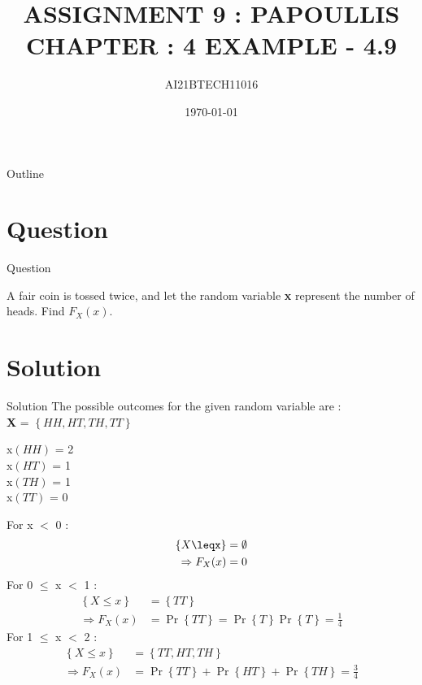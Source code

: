 \documentclass{beamer}
\title{ASSIGNMENT 9 : PAPOULLIS CHAPTER : 4 EXAMPLE - 4.9}
\author{AI21BTECH11016}
\date{\today}
\providecommand{\pr}[1]{\ensuremath{\Pr\left\{#1\right\}}}
\providecommand{\brak}[1]{\ensuremath{\left(#1\right)}}
\providecommand{\cbrak}[1]{\ensuremath{\left\{#1\right\}}}
\begin{document}
\begin{frame}
    \titlepage 
\end{frame}

\logo{}

\begin{frame}{Outline}
    \tableofcontents
\end{frame}

\section{Question}
\begin{frame}{Question}
\begin{block}{}
A fair coin is tossed twice, and let the random variable \textbf{x} represent the number of
heads. Find $F_X(x)$.
\end{block}
\end{frame}

\section{Solution}
\begin{frame}{Solution}
The possible outcomes for the given random variable are : \\
\centering
\textbf{X} = \cbrak{HH, HT, TH, TT}\\
\begin{block}{}
\centering
x$\brak{HH}$ = 2\\ 
x$\brak{HT}$ = 1\\
x$\brak{TH}$ = 1\\
x$\brak{TT}$ = 0
\end{block}
\end{frame}

\begin{frame}
For x $<$ 0 :
\begin{align}
\cbrak{X\leqx} & = \emptyset \\ \Rightarrow F_X(x) & = 0 
\end{align}
For 0 $\leq$ x $<$ 1 :
\begin{align}
\cbrak{X \leq x} & = \cbrak{TT} \\ \Rightarrow F_X(x)& = \pr{TT} = \pr{T} \pr{T} = \frac{1}{4}
\end{align}
For 1 $\leq$ x $<$ 2 :
\begin{align}
\cbrak{X \leq x} & = \cbrak{TT, HT, TH} \\ \Rightarrow F_X(x)& = \pr{TT} + \pr{HT} + \pr{TH} = \frac{3}{4}
\end{align}
\end{frame}
\end{document}
